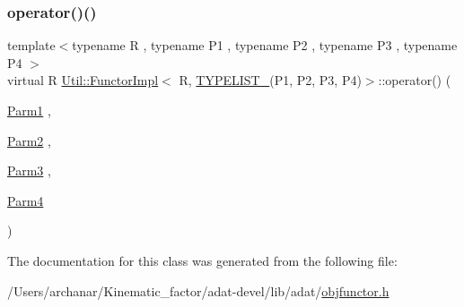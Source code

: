 \subsubsection{\texorpdfstring{operator()()}{operator()()}\hspace{0.1cm}{\footnotesize\ttfamily [3/3]}}
{\footnotesize\ttfamily template$<$typename R , typename P1 , typename P2 , typename P3 , typename P4 $>$ \\
virtual R \mbox{\hyperlink{classUtil_1_1FunctorImpl}{Util\+::\+Functor\+Impl}}$<$ R, \mbox{\hyperlink{adat__devel__install_2include_2adat_2typelist_8h_a7a156c571ab21a16b0495e1c882a07fa}{T\+Y\+P\+E\+L\+I\+S\+T\+\_}}(P1, P2, P3, P4)$>$\+::operator() (\begin{DoxyParamCaption}\item[{\mbox{\hyperlink{structUtil_1_1Private_1_1FunctorImplBase_a9d61e693d6c616dea5bd9d9073c7d21a}{Parm1}}}]{,  }\item[{\mbox{\hyperlink{structUtil_1_1Private_1_1FunctorImplBase_a554085cd798ef14838a59b528f0feb2e}{Parm2}}}]{,  }\item[{\mbox{\hyperlink{structUtil_1_1Private_1_1FunctorImplBase_a052148e627fd4caecbcffdbdf1033dbb}{Parm3}}}]{,  }\item[{\mbox{\hyperlink{structUtil_1_1Private_1_1FunctorImplBase_a1ad7fe3f243480c44a610927ebe76762}{Parm4}}}]{ }\end{DoxyParamCaption})\hspace{0.3cm}{\ttfamily [pure virtual]}}



The documentation for this class was generated from the following file\+:\begin{DoxyCompactItemize}
\item 
/\+Users/archanar/\+Kinematic\+\_\+factor/adat-\/devel/lib/adat/\mbox{\hyperlink{adat-devel_2lib_2adat_2objfunctor_8h}{objfunctor.\+h}}\end{DoxyCompactItemize}
